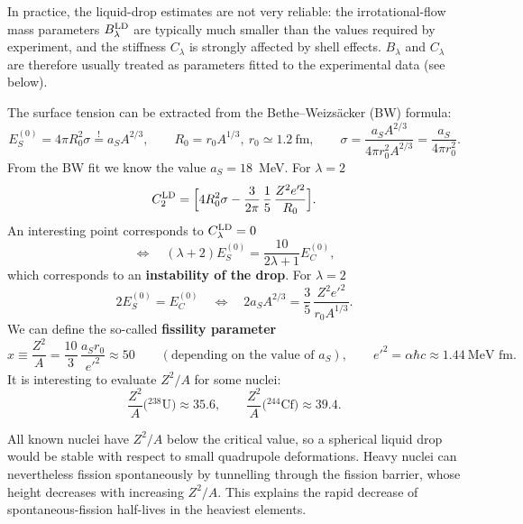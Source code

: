 \documentclass[11pt,a4paper]{article}
\begin{document}
In practice, the liquid-drop estimates are not very reliable: the irrotational-flow mass parameters $B_\lambda^{\rm LD}$ are typically much smaller than the values required by experiment, and the stiffness $C_\lambda$ is strongly affected by shell effects. $B_\lambda$ and $C_\lambda$ are therefore usually treated as parameters fitted to the experimental data (see below).


The surface tension can be extracted from the Bethe--Weizs\"acker (BW) formula:
\[
E_S^{(0)}=4\pi R_0^2\sigma\overset{!}{=}a_SA^{2/3},\qquad R_0=r_0A^{1/3},\ r_0\simeq1.2\ \text{fm},
\qquad
\sigma=\frac{a_SA^{2/3}}{4\pi r_0^2A^{2/3}}=\frac{a_S}{4\pi r_0^2}.
\]
From the BW fit we know the value $a_S=18$~MeV. For $\lambda=2$
\[
C_2^{\rm LD}=\Big[4R_0^2\sigma-\frac{3}{2\pi}\,\frac15\,\frac{Z^2e'^2}{R_0}\Big].
\]
An interesting point corresponds to $C_\lambda^{\rm LD}=0$
\[
\Longleftrightarrow\quad(\lambda+2)E_S^{(0)}=\frac{10}{2\lambda+1}E_C^{(0)},
\]
which corresponds to an \textbf{instability of the drop}. For $\lambda=2$
\[
2E_S^{(0)}=E_C^{(0)}\quad\Longleftrightarrow\quad 2a_SA^{2/3}=\frac35\,\frac{Z^2e'^2}{r_0A^{1/3}} .
\]
We can define the so-called \textbf{fissility parameter}
\[
x\equiv\frac{Z^2}{A}=\frac{10}{3}\,\frac{a_Sr_0}{e'^2}\approx50
\qquad(\text{depending on the value of }a_S),
\qquad e'^2=\alpha\hbar c\approx1.44\ \text{MeV fm}.
\]
It is interesting to evaluate $Z^2/A$ for some nuclei:
\[
\frac{Z^2}{A}\big({}^{238}\text{U}\big)\approx35.6,\qquad \frac{Z^2}{A}\big({}^{244}\text{Cf}\big)\approx39.4 .
\]

All known nuclei have $Z^2/A$ below the critical value, so a spherical liquid drop would be stable with respect to small quadrupole deformations. Heavy nuclei can nevertheless fission spontaneously by tunnelling through the fission barrier, whose height decreases with increasing $Z^2/A$. This explains the rapid decrease of spontaneous-fission half-lives in the heaviest elements.
\end{document}
